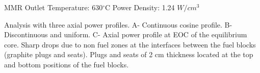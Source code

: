 MMR
Outlet Temperature: 630$^{\circ}$C
Power Density: 1.24 $W/cm^3$
\cite{usnc_mmr_2019}


Analysis with three axial power profiles.
A- Continuous cosine profile.
B- Discontinuous and uniform.
C- Axial power profile at EOC of the equilibrium core.
Sharp drops due to non fuel zones at the interfaces between the fuel blocks (graphite plugs and seats). Plugs and seats of 2 cm thickness located at the top and bottom positions of the fuel blocks.
\cite{tak_practical_2012}